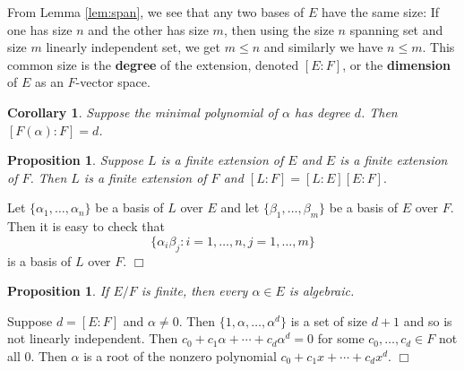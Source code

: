 \documentclass{article}
\newtheorem{cor}[subsection]{Corollary}
\newtheorem{proposition}[subsection]{Proposition}
\newenvironment{proof}{\noindent {\bf Proof:}}{$\Box$ \vspace{2 ex}}
\begin{document}
From Lemma \ref{lem:span}, we see that any two bases of $E$ have the same size: If one has size $n$ and the other has size $m$, then using the size $n$ spanning set and size $m$ linearly independent set, we get $m\leq n$ and similarly we have $n\leq m$. This common size is the \textbf{degree} of the extension, denoted $[E:F]$, or the \textbf{dimension} of $E$ as an $F$-vector space.

\begin{cor}
    Suppose the minimal polynomial of $\alpha$ has degree $d$. Then $[F(\alpha):F] = d$.
\end{cor}

\begin{proposition}
    Suppose $L$ is a finite extension of $E$ and $E$ is a finite extension of $F$. Then $L$ is a finite extension of $F$ and $[L:F] = [L:E][E:F].$
\end{proposition}

\begin{proof}
    Let $\{\alpha_1,\ldots,\alpha_n\}$ be a basis of $L$ over $E$ and let $\{\beta_1,\ldots,\beta_m\}$ be a basis of $E$ over $F$. Then it is easy to check that $$\{\alpha_i\beta_j\colon i = 1,\ldots,n, j = 1,\ldots,m\}$$ is a basis of $L$ over $F$.
\end{proof}

\begin{proposition}
    If $E/F$ is finite, then every $\alpha\in E$ is algebraic.
\end{proposition}

\begin{proof}
    Suppose $d = [E:F]$ and $\alpha\neq 0$. Then $\{1,\alpha,\ldots,\alpha^d\}$ is a set of size $d+1$ and so is not linearly independent. Then $c_0 + c_1\alpha + \cdots + c_d\alpha^d = 0$ for some $c_0,\ldots,c_d\in F$ not all $0$. Then $\alpha$ is a root of the nonzero polynomial $c_0 + c_1x + \cdots + c_dx^d$.
\end{proof}
\end{document}
